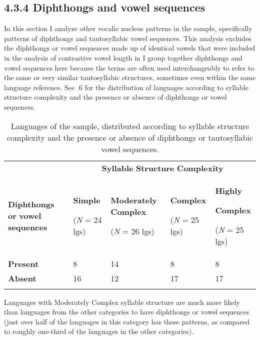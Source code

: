 \subsection{4.3.4 Diphthongs and vowel sequences}

  In this section I analyze other vocalic nucleus patterns in the sample, specifically patterns of diphthongs and tautosyllabic vowel sequences. This analysis excludes the diphthongs or vowel sequences made up of identical vowels that were included in the analysis of contrastive vowel length in  I group together diphthongs and vowel sequences here because the terms are often used interchangeably to refer to the same or very similar tautosyllabic structures, sometimes even within the same language reference. See .6 for the distribution of languages according to syllable structure complexity and the presence or absence of diphthongs or vowel sequences.

\begin{table}
\begin{tabularx}{\textwidth}{XXXXX}
 & \multicolumn{4}{c}{ \textbf{Syllable} \textbf{Structure} \textbf{Complexity}}\\
\lsptoprule
\textbf{Diphthongs} \textbf{or} \textbf{vowel} \textbf{sequences} & { \textbf{Simple}}

 (\textit{N} = 24 lgs) & { \textbf{Moderately} \textbf{Complex}}

 (\textit{N} = 26 lgs) & { \textbf{Complex}}

 (\textit{N} = 25 lgs) & { \textbf{Highly} }

{ \textbf{Complex}}

 (\textit{N} = 25 lgs)\\
\textbf{Present} & 8 & 14 & 8 & 8\\
\textbf{Absent} & 16 & 12 & 17 & 17\\
\lspbottomrule
\end{tabularx}
\caption{\label{4.6}Languages of the sample, distributed according to syllable structure complexity and the presence or absence of diphthongs or tautosyllabic vowel sequences.}
\end{table}

  Languages with Moderately Complex syllable structure are much more likely than languages from the other categories to have diphthongs or vowel sequences (just over half of the languages in this category has these patterns, as compared to roughly one-third of the languages in the other categories).


